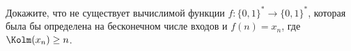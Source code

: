 Докажите, что не существует вычислимой функции $f\colon \{0, 1\}^* \to \{0, 1\}^*$, которая была бы определена
на бесконечном числе входов и $f(n) = x_n$, где $\Kolm(x_n) \ge n$.